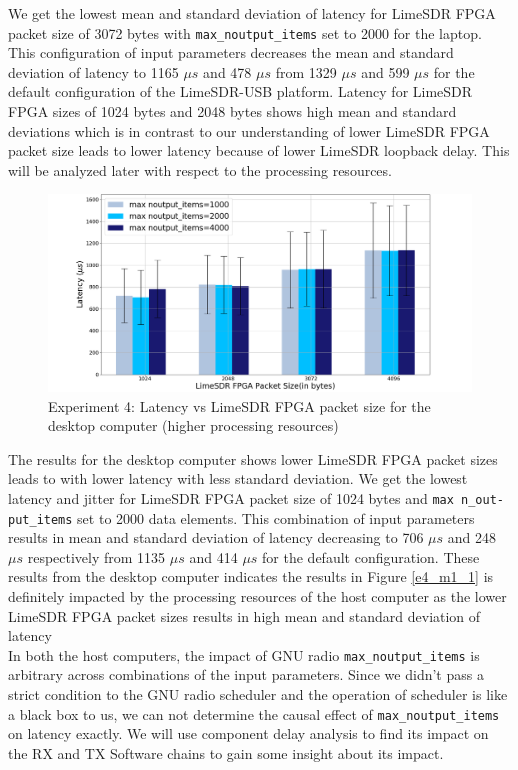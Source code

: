 We get the lowest mean and standard deviation of latency for LimeSDR FPGA packet size of 3072 bytes with \texttt{max\_noutput\_items} set to 2000 for the laptop.
This configuration of input parameters decreases the mean and standard deviation of latency to  1165 $\mu s$ and 478 $\mu s$  from 1329 $\mu s$ and 599 $\mu s$ for the default configuration of the LimeSDR-USB platform.
Latency for LimeSDR FPGA sizes of 1024 bytes and 2048 bytes shows high mean and standard deviations which is in contrast to our understanding of lower LimeSDR FPGA packet size leads to lower latency because of lower LimeSDR loopback delay. This will be analyzed later with respect to the processing resources.\\

\begin{figure}[h!]
\centering
\includegraphics[width=\textwidth]{Thesis/Figure/E4_M2_1.png}
\caption{Experiment 4: Latency vs LimeSDR FPGA packet size for the desktop computer (higher processing resources)}
\label{e4_m2_1}
\end{figure}

The results for the desktop computer shows lower LimeSDR FPGA packet sizes leads to with lower latency with less standard deviation.
We get the lowest latency and jitter for LimeSDR FPGA packet size of 1024 bytes and \texttt{max  n\_out-\\put\_items} set to 2000 data elements.
This combination of input parameters results in mean and standard deviation of latency decreasing to 706 $\mu s$ and 248 $\mu s$ respectively from 1135 $\mu s$ and 414 $\mu s$ for the default configuration.
These results from the desktop computer indicates the results in Figure \ref{e4_m1_1} is definitely impacted by the processing resources of the host computer as the lower LimeSDR FPGA packet sizes results in high mean and standard deviation of latency\\

In both the host computers, the impact of GNU radio \texttt{max\_noutput\_items} is arbitrary across combinations of the input parameters.
Since we didn't pass a strict condition to the GNU radio scheduler and the operation of scheduler is like a black box to us, we can not determine the causal effect of \texttt{max\_noutput\_items} on latency exactly.
We will use component delay analysis to find its impact on the RX and TX Software chains to gain some insight about its impact.\\

